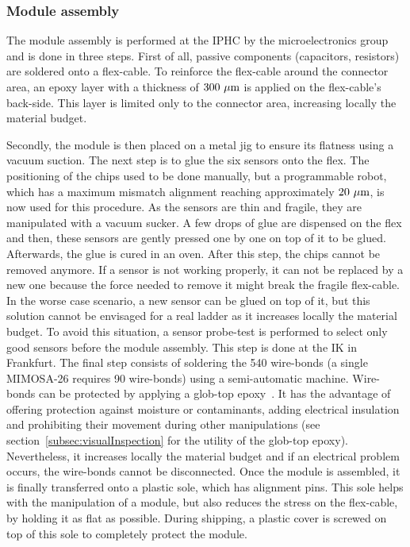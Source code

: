     \subsubsection{Module assembly}
    \label{subsec:modAssembly}

    The module assembly is performed at the \gls{IPHC} by the microelectronics group and is done in three steps.
    First of all, passive components (capacitors, resistors) are soldered onto a flex-cable.
    To reinforce the flex-cable around the connector area, an epoxy layer with a thickness of $300~\rm{\mu m}$ is applied on the flex-cable's back-side.
    This layer is limited only to the connector area, increasing locally the material budget.
    

    Secondly, the module is then placed on a metal jig to ensure its flatness using a vacuum suction.
    The next step is to glue the six sensors onto the flex.
    The positioning of the chips used to be done manually, but a programmable robot, which has a maximum mismatch alignment reaching approximately $20~\mu\rm{m}$, is now used for this procedure.
    As the sensors are thin and fragile, they are manipulated with a vacuum sucker.
    A few drops of glue are dispensed on the flex and then, these sensors are gently pressed one by one on top of it to be glued.
    Afterwards, the glue is cured in an oven. After this step, the chips cannot be removed anymore.
    If a sensor is not working properly, it can not be replaced by a new one because the force needed to remove it might break the fragile flex-cable.
    In the worse case scenario, a new sensor can be glued on top of it, but this solution cannot be envisaged for a real ladder as it increases locally the material budget.
    To avoid this situation, a sensor probe-test is performed to select only good sensors before the module assembly.
    This step is done at the IK in Frankfurt.
    The final step consists of soldering the 540 wire-bonds (a single \gls{MIMOSA}-26 requires 90 wire-bonds) using a semi-automatic machine.
    Wire-bonds can be protected by applying a glob-top epoxy~\cite{minges1989electronic}.
    It has the advantage of offering protection against moisture or contaminants, adding electrical insulation and prohibiting their movement during other manipulations (see section~\ref{subsec:visualInspection} for the utility of the glob-top epoxy). 
    Nevertheless, it increases locally the material budget and if an electrical problem occurs, the wire-bonds cannot be disconnected.
    Once the module is assembled, it is finally transferred onto a plastic sole, which has alignment pins.
    This sole helps with the manipulation of a module, but also reduces the stress on the flex-cable, by holding it as flat as possible.
    During shipping, a plastic cover is screwed on top of this sole to completely protect the module.

